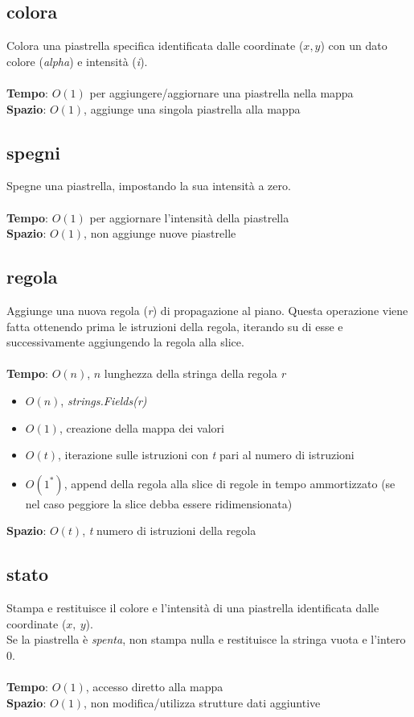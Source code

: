 \documentclass{article}
\begin{document}
\subsection{colora}\label{subsec:color}
Colora una piastrella specifica identificata dalle coordinate (\(x, y\)) con un dato colore (\textit{alpha}) e intensità (\textit{i}).\\ \\
\textbf{Tempo}: \(O(1)\) per aggiungere/aggiornare una piastrella nella mappa\\
\textbf{Spazio}: \(O(1)\), aggiunge una singola piastrella alla mappa

\subsection{spegni}
Spegne una piastrella, impostando la sua intensità a zero.\\ \\
\textbf{Tempo}: \(O(1)\) per aggiornare l'intensità della piastrella\\
\textbf{Spazio}: \(O(1)\), non aggiunge nuove piastrelle

\subsection{regola}
Aggiunge una nuova regola (\textit{r}) di propagazione al piano. Questa operazione viene fatta ottenendo prima le istruzioni della regola, iterando su di esse e successivamente aggiungendo la regola alla slice.\\ \\
\textbf{Tempo}: \(O(n)\), \(n\) lunghezza della stringa della regola \textit{r}
\begin{itemize}
  \item \(O(n)\), \textit{strings.Fields(r)} 
  \item \(O(1)\), creazione della mappa dei valori
  \item \(O(t)\), iterazione sulle istruzioni con \textit{t} pari al numero di istruzioni
  \item \(O(1^*)\), append della regola alla slice di regole in tempo ammortizzato (se nel caso peggiore la slice debba essere ridimensionata)
\end{itemize}
\textbf{Spazio}: \(O(t)\), \textit{t} numero di istruzioni della regola

\subsection{stato}
Stampa e restituisce il colore e l’intensità di una piastrella identificata dalle coordinate (\(x,\ y\)).\\
Se la piastrella è \textit{spenta}, non stampa nulla e restituisce la stringa vuota e l'intero \(0\).\\ \\
\textbf{Tempo}: \(O(1)\), accesso diretto alla mappa\\
\textbf{Spazio}: \(O(1)\), non modifica/utilizza strutture dati aggiuntive
\end{document}
